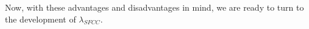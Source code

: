 \documentclass[11pt]{article}
\begin{document}
Now, with these advantages and disadvantages in mind, we are ready to turn to the development of $\lambda_{SFCC}$.

%




%
%
%
%
%
%
%
\end{document}
